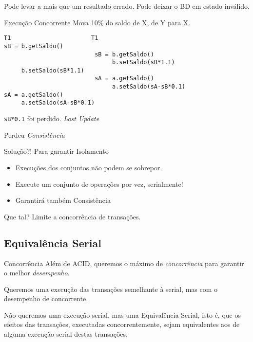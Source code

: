 Pode levar a mais que um resultado errado. Pode deixar o BD em estado inválido.

\begin{frame}[fragile]{Execução Concorrente}
Mova 10\% do saldo de X, de Y para X.
\begin{verbatim}
T1                       T1
sB = b.getSaldo()
                          sB = b.getSaldo()
                               b.setSaldo(sB*1.1)
     b.setSaldo(sB*1.1)                                        
                          sA = a.getSaldo()                          
                               a.setSaldo(sA-sB*0.1)
sA = a.getSaldo()                          
     a.setSaldo(sA-sB*0.1)
\end{verbatim}

\pause \verb|sB*0.1| foi perdido. \emph{Lost Update}

\pause Perdeu \emph{Consistência}
\end{frame}



\begin{frame}{Solução?!}
Para garantir Isolamento
\begin{itemize}
	\item Execuções dos conjuntos não podem se sobrepor.
	\item Execute um conjunto de operações por vez, serialmente!
	\item Garantirá também Consistência
\end{itemize}


\pause \alert{Que tal?}
\pause Limite a concorrência de transações.
\end{frame}

\subsection{Equivalência Serial}

\begin{frame}{Concorrência}
Além de ACID, queremos o máximo de \emph{concorrência} para garantir o melhor \emph{desempenho}.\pause

Queremos uma execução das transações semelhante à serial, mas com o desempenho de concorrente.\pause

Não queremos uma execução serial, mas uma \alert{Equivalência Serial}, isto é, que os efeitos das transações, executadas concorrentemente, sejam equivalentes aos de alguma execução serial destas transações.
\end{frame}

